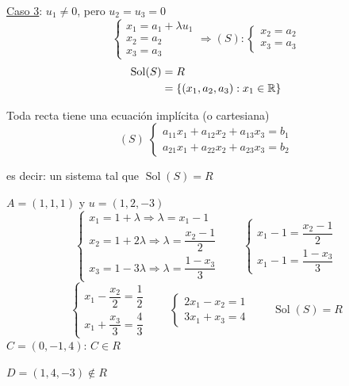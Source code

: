 \documentclass[11pt,a4paper]{article}
\DeclareMathOperator{\Sol}{Sol}
\begin{document}
\underline{Caso 3}: $u_1\neq0$, pero $u_2=u_3=0$
\[
\begin{cases}
x_1=a_1+\lambda u_1\\
x_2=a_2\\
x_3=a_3
\end{cases}
\Longrightarrow(S):\begin{cases}x_2=a_2\\x_3=a_3\end{cases}
\]
\begin{align*}
\Sol(S)&=R\\
&=\{(x_1,a_2,a_3):x_1\in\R\}
\end{align*}

\begin{proposicion}
Toda recta tiene una ecuación implícita (o cartesiana)
\[
(S)\;\begin{cases}
a_{11}x_1+a_{12}x_2+a_{13}x_3=b_1\\
a_{21}x_1+a_{22}x_2+a_{23}x_3=b_2
\end{cases}
\]

es decir: un sistema tal que $\Sol(S)=R$
\end{proposicion}

\begin{ejemplo}
$A=(1,1,1)$ y $u=(1,2,-3)$
\[
\begin{cases}
x_1=1+\lambda\Rightarrow\lambda=x_1-1\\[4pt]
x_2=1+2\lambda\Rightarrow\lambda=\dfrac{x_2-1}{2}\\[10pt]
x_3=1-3\lambda\Rightarrow\lambda=\dfrac{1-x_3}{3}
\end{cases}
\qquad
\begin{cases}
x_1-1=\dfrac{x_2-1}{2}\\[10pt]
x_1-1=\dfrac{1-x_3}{3}
\end{cases}
\]
\[
\begin{cases}
x_1-\dfrac{x_2}{2}=\dfrac12\\[10pt]
x_1+\dfrac{x_3}{3}=\dfrac43
\end{cases}
\qquad
\begin{cases}
2x_1-x_2=1\\
3x_1+x_3=4
\end{cases}
\qquad\Sol(S)=R
\]
$C=(0,-1,4)$: $C\in R$

$D=(1,4,-3)\notin R$
\end{ejemplo}

\end{document}

